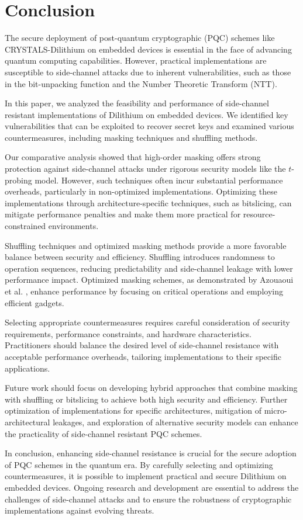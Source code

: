 \chapter{Conclusion}
\thispagestyle{chapterstart}

The secure deployment of post-quantum cryptographic (PQC) schemes like CRYSTALS-Dilithium on embedded devices is essential in the face of advancing quantum computing capabilities. However, practical implementations are susceptible to side-channel attacks due to inherent vulnerabilities, such as those in the bit-unpacking function and the Number Theoretic Transform (NTT).

In this paper, we analyzed the feasibility and performance of side-channel resistant implementations of Dilithium on embedded devices. We identified key vulnerabilities that can be exploited to recover secret keys and examined various countermeasures, including masking techniques and shuffling methods.

Our comparative analysis showed that high-order masking offers strong protection against side-channel attacks under rigorous security models like the $t$-probing model. However, such techniques often incur substantial performance overheads, particularly in non-optimized implementations. Optimizing these implementations through architecture-specific techniques, such as bitslicing, can mitigate performance penalties and make them more practical for resource-constrained environments.

Shuffling techniques and optimized masking methods provide a more favorable balance between security and efficiency. Shuffling introduces randomness to operation sequences, reducing predictability and side-channel leakage with lower performance impact. Optimized masking schemes, as demonstrated by Azouaoui et al. \cite{Azouaoui22}, enhance performance by focusing on critical operations and employing efficient gadgets.

Selecting appropriate countermeasures requires careful consideration of security requirements, performance constraints, and hardware characteristics. Practitioners should balance the desired level of side-channel resistance with acceptable performance overheads, tailoring implementations to their specific applications.

Future work should focus on developing hybrid approaches that combine masking with shuffling or bitslicing to achieve both high security and efficiency. Further optimization of implementations for specific architectures, mitigation of micro-architectural leakages, and exploration of alternative security models can enhance the practicality of side-channel resistant PQC schemes.

In conclusion, enhancing side-channel resistance is crucial for the secure adoption of PQC schemes in the quantum era. By carefully selecting and optimizing countermeasures, it is possible to implement practical and secure Dilithium on embedded devices. Ongoing research and development are essential to address the challenges of side-channel attacks and to ensure the robustness of cryptographic implementations against evolving threats.
